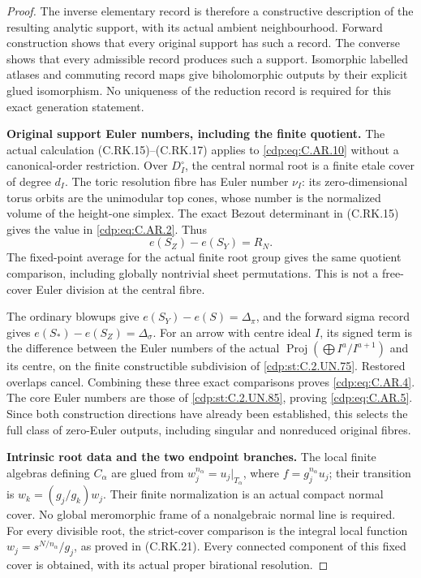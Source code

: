 \begin{proof}
The inverse elementary record is therefore
a constructive description of the resulting
analytic support, with its actual ambient
neighbourhood. Forward construction shows
that every original support has such a
record. The converse shows that every
admissible record produces such a support.
Isomorphic labelled atlases and commuting
record maps give biholomorphic outputs
by their explicit glued isomorphism.
No uniqueness of the reduction record is
required for this exact generation statement.

\par\medskip\noindent\textbf{Original support Euler numbers, including the finite quotient.}
The actual calculation (C.RK.15)--(C.RK.17)
applies to \eqref{cdp:eq:C.AR.10} without a canonical-order
restriction. Over \(D_I^\circ\), the central
normal root is a finite etale cover of degree
\(d_I\). The toric resolution fibre has Euler
number \(\nu_I\): its zero-dimensional torus
orbits are the unimodular top cones, whose
number is the normalized volume of the
height-one simplex. The exact Bezout
determinant in (C.RK.15) gives the value
in \eqref{cdp:eq:C.AR.2}. Thus
\[
       e(S_Z)-e(S_Y)=R_N.
 \tag{C.AR.14}\label{cdp:eq:C.AR.14}
\]
The fixed-point average for the actual
finite root group gives the same quotient
comparison, including globally nontrivial
sheet permutations. This is not a free-cover
Euler division at the central fibre.

The ordinary blowups give
\(e(S_Y)-e(S)=\Delta_\pi\), and the
forward sigma record gives
\(e(S_*)-e(S_Z)=\Delta_\sigma\).
For an arrow with centre ideal \(I\),
its signed term is the difference between
the Euler numbers of the actual
\(\operatorname{Proj}(\bigoplus I^a/I^{a+1})\)
and its centre, on the finite constructible
subdivision of \ref{cdp:st:C.2.UN.75}. Restored overlaps
cancel. Combining these three exact
comparisons proves \eqref{cdp:eq:C.AR.4}. The core
Euler numbers are those of \ref{cdp:st:C.2.UN.85}, proving
\eqref{cdp:eq:C.AR.5}. Since both construction
directions have already been established,
this selects the full class of zero-Euler
outputs, including singular and nonreduced
original fibres.

\par\medskip\noindent\textbf{Intrinsic root data and the two endpoint branches.}
The local finite algebras defining
\(C_\alpha\) are glued from
\(w_j^{n_\alpha}=u_j|_{T_\alpha}\), where
\(f=g_j^{n_\alpha}u_j\); their transition
is \(w_k=(g_j/g_k)w_j\). Their finite
normalization is an actual compact
normal cover. No global meromorphic
frame of a nonalgebraic normal line
is required. For every divisible
root, the strict-cover comparison is
the integral local function
\(w_j=s^{N/n_\alpha}/g_j\), as proved
in (C.RK.21). Every connected component
of this fixed cover is obtained, with
its actual proper birational resolution.


\end{proof}
